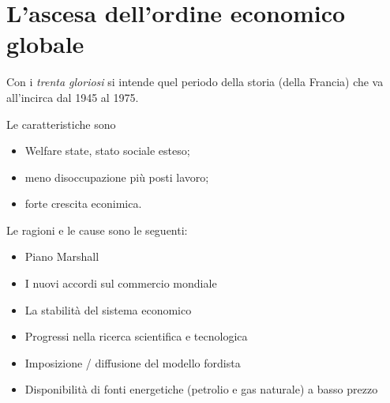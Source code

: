 \documentclass[a4paper]{article}
\begin{document}


\section{L'ascesa dell'ordine economico globale}

Con i \textit{trenta gloriosi} si intende quel periodo della storia (della Francia)
che va all'incirca dal 1945 al 1975.

Le caratteristiche sono
\begin{itemize}
    \item Welfare state, stato sociale esteso;
    \item meno disoccupazione più posti lavoro;
    \item forte crescita econimica.
\end{itemize}


Le ragioni e le cause sono le seguenti:
\begin{itemize}
    \item Piano Marshall
    \item I nuovi accordi sul commercio mondiale
    \item La stabilità del sistema economico
    \item Progressi nella ricerca scientifica e tecnologica
    \item Imposizione / diffusione del modello fordista
    \item Disponibilità di fonti energetiche (petrolio e gas naturale) a basso prezzo
\end{itemize}



% 
\end{document}
